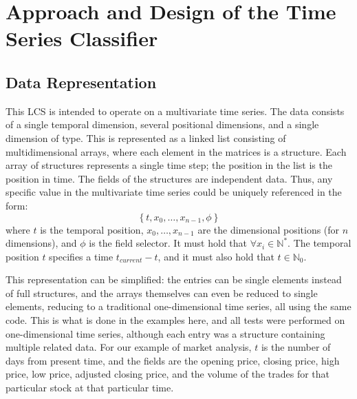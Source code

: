 \section{Approach and Design of the Time Series Classifier}

\vspace{-\baselineskip}



\subsection{Data Representation}
This LCS is intended to operate on a multivariate time series.
The data consists of a single temporal dimension, several positional dimensions, and a single dimension of type.
This is represented as a linked list consisting of multidimensional arrays, where each element in the matrices is a structure.
Each array of structures represents a single time step; the position in the list is the position in time.
The fields of the structures are independent data.
Thus, any specific value in the multivariate time series could be uniquely referenced in the form:
\begin{equation}
\left\{ t, x_0, \ldots, x_{n-1}, \phi \right\}
\end{equation}
where $t$ is the temporal position,
$x_0,\ldots,x_{n-1}$ are the dimensional positions (for $n$ dimensions),
and $\phi$ is the field selector.
It must hold that $\forall x_i \in \mathbb{N^*}$.
The temporal position $t$ specifies a time $t_{current}-t$, and it must also hold that
$t \in \mathbb{N}_0$.

This representation can be simplified: the entries can be single elements instead of full structures, and the arrays themselves can even be reduced to single elements, reducing to a traditional one-dimensional time series, all using the same code.
This is what is done in the examples here, and all tests were performed on one-dimensional time series, although each entry was a structure containing multiple related data.
For our example of market analysis, $t$ is the number of days from present time, and the fields are the opening price, closing price, high price, low price, adjusted closing price, and the volume of the trades for that particular stock at that particular time.

\newpage
